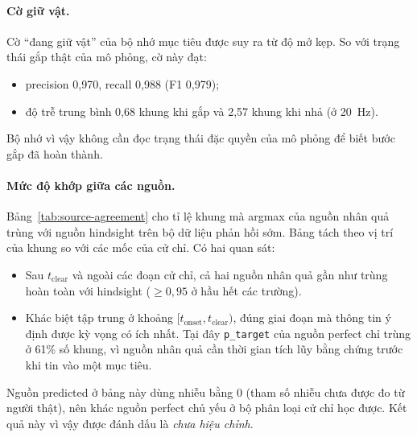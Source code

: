 \paragraph{Cờ giữ vật.} Cờ ``đang giữ vật'' của bộ nhớ mục tiêu được suy ra từ độ mở kẹp. So với trạng thái gắp thật của mô phỏng, cờ này đạt:
\begin{itemize}
  \item precision 0,970, recall 0,988 (F1 0,979);
  \item độ trễ trung bình 0,68 khung khi gắp và 2,57 khung khi nhả (ở 20~Hz).
\end{itemize}
Bộ nhớ vì vậy không cần đọc trạng thái đặc quyền của mô phỏng để biết bước gắp đã hoàn thành.

\paragraph{Mức độ khớp giữa các nguồn.} Bảng~\ref{tab:source-agreement} cho tỉ lệ khung mà argmax của nguồn nhân quả trùng với nguồn hindsight trên bộ dữ liệu phản hồi sớm. Bảng tách theo vị trí của khung so với các mốc của cử chỉ. Có hai quan sát:
\begin{itemize}
  \item Sau $t_\text{clear}$ và ngoài các đoạn cử chỉ, cả hai nguồn nhân quả gần như trùng hoàn toàn với hindsight ($\geq 0{,}95$ ở hầu hết các trường).
  \item Khác biệt tập trung ở khoảng $[t_\text{onset}, t_\text{clear})$, đúng giai đoạn mà thông tin ý định được kỳ vọng có ích nhất. Tại đây \texttt{p\_target} của nguồn perfect chỉ trùng ở 61\% số khung, vì nguồn nhân quả cần thời gian tích lũy bằng chứng trước khi tin vào một mục tiêu.
\end{itemize}

Nguồn predicted ở bảng này dùng nhiễu bằng 0 (tham số nhiễu chưa được đo từ người thật), nên khác nguồn perfect chủ yếu ở bộ phân loại cử chỉ học được. Kết quả này vì vậy được đánh dấu là \emph{chưa hiệu chỉnh}.

